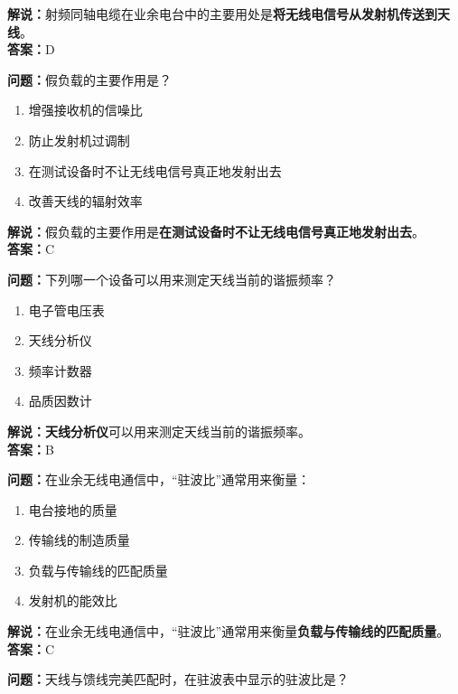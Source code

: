 \textbf{解说：}射频同轴电缆在业余电台中的主要用处是\textbf{将无线电信号从发射机传送到天线}。\\\textbf{答案：}D



\textbf{问题：}假负载的主要作用是？

\begin{enumerate}[label=\Alph*), leftmargin=1.5cm]
	\item 增强接收机的信噪比
	\item 防止发射机过调制
	\item 在测试设备时不让无线电信号真正地发射出去
	\item 改善天线的辐射效率
\end{enumerate}

\textbf{解说：}假负载的主要作用是\textbf{在测试设备时不让无线电信号真正地发射出去}。\\\textbf{答案：}C



\textbf{问题：}下列哪一个设备可以用来测定天线当前的谐振频率？

\begin{enumerate}[label=\Alph*), leftmargin=1.5cm]
	\item 电子管电压表
	\item 天线分析仪
	\item 频率计数器
	\item 品质因数计
\end{enumerate}

\textbf{解说：}\textbf{天线分析仪}可以用来测定天线当前的谐振频率。\\\textbf{答案：}B



\textbf{问题：}在业余无线电通信中，“驻波比”通常用来衡量：

\begin{enumerate}[label=\Alph*), leftmargin=1.5cm]
	\item 电台接地的质量
	\item 传输线的制造质量
	\item 负载与传输线的匹配质量
	\item 发射机的能效比
\end{enumerate}

\textbf{解说：}在业余无线电通信中，“驻波比”通常用来衡量\textbf{负载与传输线的匹配质量}。\\\textbf{答案：}C



\textbf{问题：}天线与馈线完美匹配时，在驻波表中显示的驻波比是？

